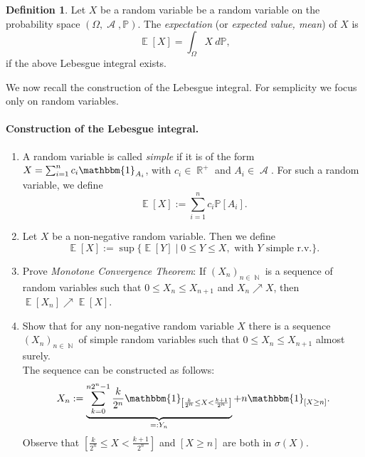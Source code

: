 \documentclass[12pt,a4paper]{report}
\theoremstyle{definition}
\newtheorem{definition}[theorem]{Definition}
\theoremstyle{num.custom-title}
\DeclareMathOperator{\A}{\mathcal{A}}
\DeclareMathOperator{\E}{\mathbb{E}}
\DeclareMathOperator{\N}{\mathbb{N}}
\DeclareMathOperator{\R}{\mathbb{R}}
\renewcommand{\1}{\mathbbm{1}}
\renewcommand{\P}{\mathbb{P}}
\begin{document}
\begin{definition}
Let $X$ be a random variable be a random variable on the probability space $(\Omega,\A,\P)$. The \emph{expectation} (or \emph{expected value, mean}) of $X$ is
\[
\E[X] = \int_\Omega X \ d\P,
\]
if the above Lebesgue integral exists.
\end{definition}

We now recall the construction of the Lebesgue integral. For semplicity we focus only on random variables.

\paragraph{Construction of the Lebesgue integral.}
\begin{enumerate}
\item A random variable is called \emph{simple} if it is of the form $X = \sum_{i=1}^n c_i \1_{A_i}$, with $c_i \in \R^+$ and $A_i \in \A$. For such a random variable, we define
\[
\E[X] := \sum_{i=1}^n c_i \P[A_i].
\]
\item Let $X$ be a non-negative random variable. Then we define
\[
\E[X] := \sup\{\E[Y] \mid 0 \leq Y \leq X, \text{ with $Y$ simple r.v.}\}.
\]
\item Prove \emph{Monotone Convergence Theorem}: If $(X_n)_{n \in \N}$ is a sequence of random variables such that $0 \leq X_n \leq X_{n+1}$ and $X_n \nearrow X$, then $\E[X_n] \nearrow \E[X]$.
\item Show that for any non-negative random variable $X$ there is a sequence $(X_n)_{n \in \N}$ of simple random variables such that $0 \leq X_n \leq X_{n+1}$ almost surely.\\
The sequence can be constructed as follows:
\[
X_n := \underbrace{ \sum_{k=0}^{n2^n-1} \frac{k}{2^n} \1_{\left[ \frac{k}{2^n} \leq X < \frac{k+1}{2^n} \right]} }_{=:Y_n} + n \1_{\left[ X \geq n \right]}.
\]
Observe that $\left[ \frac{k}{2^n} \leq X < \frac{k+1}{2^n} \right]$ and $\left[ X \geq n \right]$ are both in $\sigma(X)$.


\end{enumerate}
\end{document}
